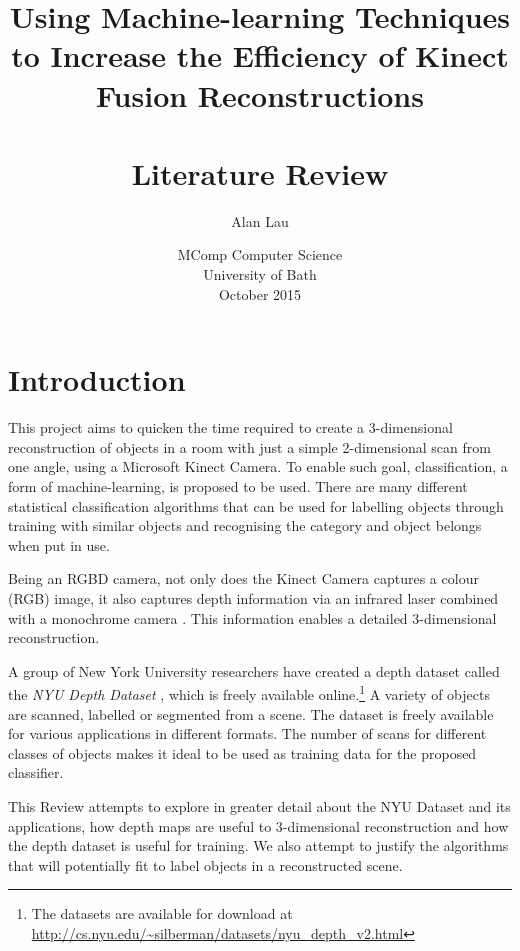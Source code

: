 \documentclass[11pt,openright,a4paper]{report}
\title{
  Using Machine-learning Techniques to Increase the Efficiency of Kinect Fusion Reconstructions
  \\~\\
  \textbf{Literature Review}
}
\author{Alan Lau}
\date{MComp Computer Science\\University of Bath\\October 2015}
\begin{document}

\maketitle
\newpage

\tableofcontents
\newpage

\setcounter{page}{1}

\setlength{\parindent}{0pt}
\setlength{\parskip}{\baselineskip}

\chapter{Introduction}
This project aims to quicken the time required to create a 3-dimensional reconstruction of objects in a room with just a simple 2-dimensional scan from one angle, using a Microsoft Kinect Camera. To enable such goal, classification, a form of machine-learning, is proposed to be used. There are many different statistical classification algorithms that can be used for labelling objects through training with similar objects and recognising the category and object belongs when put in use. 

Being an RGBD camera, not only does the Kinect Camera captures a colour (RGB) image, it also captures depth information via an infrared laser combined with a monochrome camera \cite{kinect-doc}. This information enables a detailed 3-dimensional reconstruction.

A group of New York University researchers have created a depth dataset called the \textit{NYU Depth Dataset} \cite{nyu-dataset}, which is freely available online.\footnote{The datasets are available for download at \url{http://cs.nyu.edu/~silberman/datasets/nyu_depth_v2.html}} A variety of objects are scanned, labelled or segmented from a scene. The dataset is freely available for various applications in different formats. The number of scans for different classes of objects makes it ideal to be used as training data for the proposed classifier. 

This Review attempts to explore in greater detail about the NYU Dataset and its applications, how depth maps are useful to 3-dimensional reconstruction and how the depth dataset is useful for training. We also attempt to justify the algorithms that will potentially fit to label objects in a reconstructed scene.

\newpage
\end{document}
